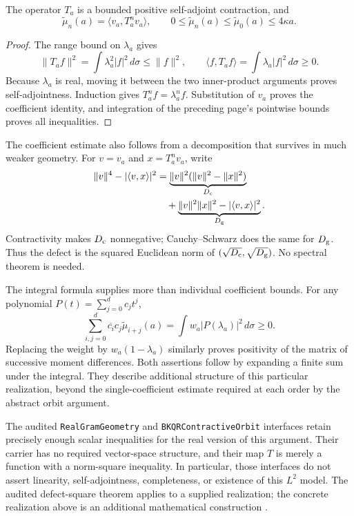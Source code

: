 \begin{proposition}\label{front:concrete-orbit}
The operator $T_a$ is a bounded positive self-adjoint contraction, and
\begin{equation}
 \widetilde\mu_n(a)=\langle v_a,T_a^n v_a\rangle,\qquad
 0\leq\widetilde\mu_n(a)\leq\widetilde\mu_0(a)\leq4\kappa a.
\end{equation}
\end{proposition}
\begin{proof}
The range bound on $\lambda_a$ gives
\begin{equation}
 \|T_af\|^2=\int\lambda_a^2|f|^2\,d\sigma\leq\|f\|^2,
 \qquad \langle f,T_af\rangle=\int\lambda_a|f|^2\,d\sigma\geq0.
\end{equation}
Because $\lambda_a$ is real, moving it between the two inner-product
arguments proves self-adjointness. Induction gives $T_a^nf=\lambda_a^nf$.
Substitution of $v_a$ proves the coefficient identity, and integration of
the preceding page's pointwise bounds proves all inequalities.
\end{proof}

The coefficient estimate also follows from a decomposition that survives
in much weaker geometry. For $v=v_a$ and $x=T_a^nv_a$, write
\begin{align}
 \|v\|^4-|\langle v,x\rangle|^2
 &=\underbrace{\|v\|^2(\|v\|^2-\|x\|^2)}_{D_{\rm c}}\nonumber\\
 &\quad+\underbrace{\|v\|^2\|x\|^2-|\langle v,x\rangle|^2}_{D_{\rm g}}.
\end{align}
Contractivity makes $D_{\rm c}$ nonnegative; Cauchy--Schwarz does the same
for $D_{\rm g}$. Thus the defect is the squared Euclidean norm of
$(\sqrt{D_{\rm c}},\sqrt{D_{\rm g}})$. No spectral theorem is needed.

The integral formula supplies more than individual coefficient bounds.
For any polynomial $P(t)=\sum_{j=0}^d c_jt^j$,
\begin{equation}
 \sum_{i,j=0}^d\overline{c_i}c_j\widetilde\mu_{i+j}(a)
 =\int w_a|P(\lambda_a)|^2\,d\sigma\geq0.
\end{equation}
Replacing the weight by $w_a(1-\lambda_a)$ similarly proves positivity
of the matrix of successive moment differences. Both assertions follow
by expanding a finite sum under the integral. They describe additional
structure of this particular realization, beyond the single-coefficient
estimate required at each order by the abstract orbit argument.

The audited \texttt{RealGramGeometry} and \texttt{BKQRContractiveOrbit}
interfaces retain precisely enough scalar inequalities for the real
version of this argument. Their carrier has no required vector-space
structure, and their map $T$ is merely a function with a norm-square
inequality. In particular, those interfaces do not assert linearity,
self-adjointness, completeness, or existence of this $L^2$ model. The
audited defect-square theorem applies to a supplied realization; the
concrete realization above is an additional mathematical construction
\cite{source}.

